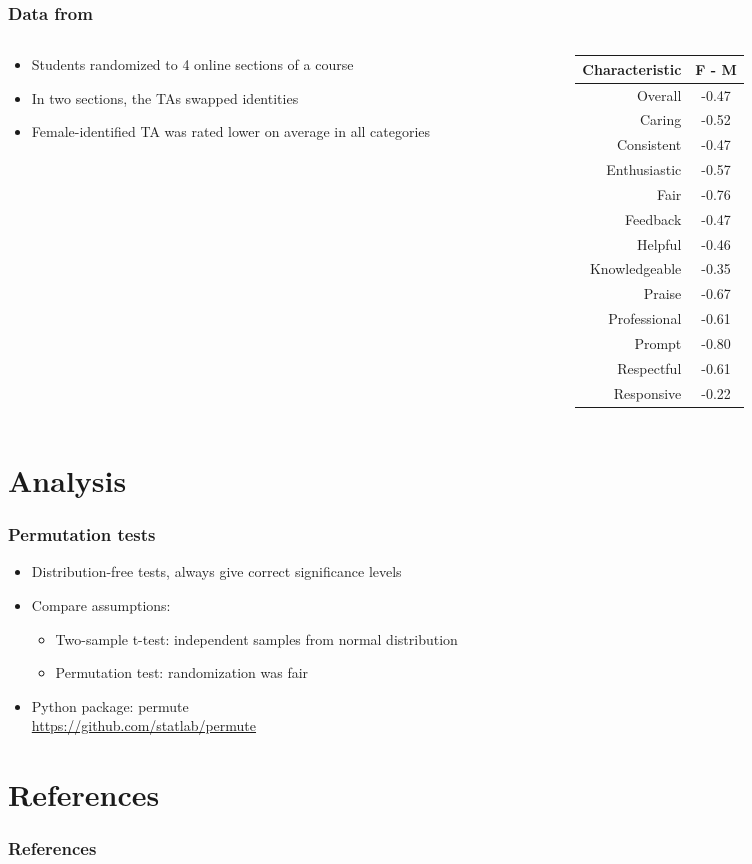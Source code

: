 \documentclass{beamer}
\begin{document}
\frame
{
  \frametitle{Data from \cite{MacNell2014}}
\begin{columns}[T]
\begin{column}{.5\textwidth}
\begin{center}

\begin{itemize}
\item Students randomized to 4 online sections of a course
\item In two sections, the TAs swapped identities
\item Female-identified TA was rated lower on average in all categories
\end{itemize}
\end{center}
\end{column}
\begin{column}{.5\textwidth}
\begin{table}
\begin{tabular}{r|c}
\textbf{Characteristic} & \textbf{F - M} \\
\hline
Overall & -0.47 \\
Caring & -0.52 \\
Consistent & -0.47 \\
Enthusiastic & -0.57 \\
Fair & -0.76 \\
Feedback & -0.47 \\
Helpful & -0.46 \\
Knowledgeable & -0.35 \\
Praise & -0.67 \\
Professional & -0.61 \\
Prompt & -0.80 \\
Respectful & -0.61 \\
Responsive & -0.22
\end{tabular}
\end{table}
\end{column}
\end{columns}
}



\section{Analysis}
\frame
{
 \frametitle{Permutation tests}
\Large
 \begin{itemize}
 \item Distribution-free tests, always give correct significance levels
 \item Compare assumptions:
 \begin{itemize}
 \item Two-sample t-test: independent samples from normal distribution
 \item Permutation test: randomization was fair
 \end{itemize}
 \item{Python package: permute \\
 \url{https://github.com/statlab/permute}
 }
 \end{itemize}

}

\section{References}
\begin{frame}
\frametitle{References}


\itemize
\end{frame}
\end{document}
